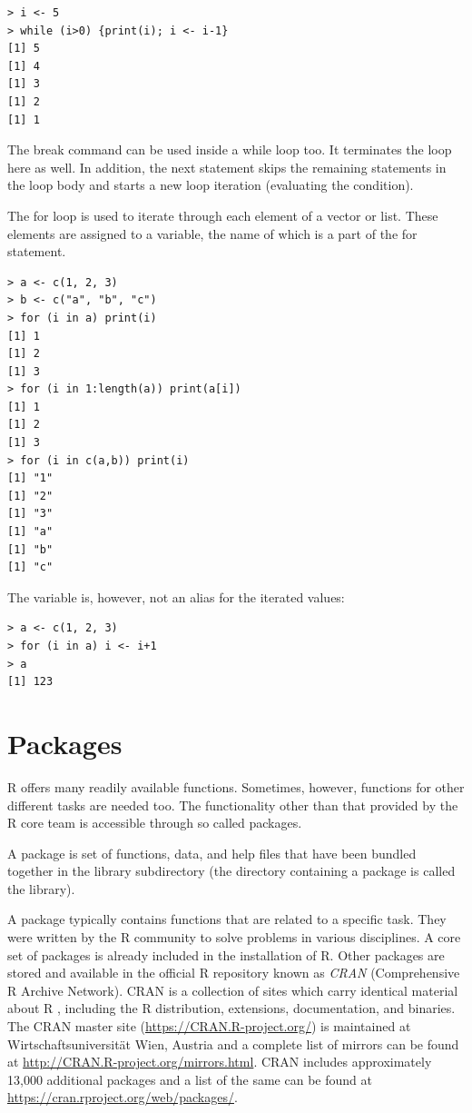 \documentclass[11pt,openany,executivepaper]{book}
\begin{document}
\begin{verbatim}
> i <- 5
> while (i>0) {print(i); i <- i-1}
[1] 5
[1] 4
[1] 3
[1] 2
[1] 1
\end{verbatim}

The break command can be used inside a while loop too. It terminates the loop here as well. In addition, the next statement skips the remaining statements in the loop body and starts a new loop iteration (evaluating the condition).

The for loop is used to iterate through each element of a vector or list. These elements are assigned to a variable, the name of which is a part of the for statement.

\begin{verbatim}
> a <- c(1, 2, 3)
> b <- c("a", "b", "c")
> for (i in a) print(i)
[1] 1
[1] 2
[1] 3
> for (i in 1:length(a)) print(a[i])
[1] 1
[1] 2
[1] 3
> for (i in c(a,b)) print(i)
[1] "1"
[1] "2"
[1] "3"
[1] "a"
[1] "b"
[1] "c"
\end{verbatim}

The variable is, however, not an alias for the iterated values:

\begin{verbatim}
> a <- c(1, 2, 3)
> for (i in a) i <- i+1
> a
[1] 123
\end{verbatim}

\section{Packages}
R offers many readily available functions. Sometimes, however, functions for other different tasks are needed too. The functionality other than that provided by the R core team is accessible through so called packages.

A package is set of functions, data, and help files that have been bundled together in the library subdirectory (the directory containing a package is called the library).
\begin{sloppypar}
A package typically contains functions that are related to a specific task. They were written by the R community to solve problems in various disciplines. A core set of packages is already included in the installation of R. Other packages are stored and available in the official R repository known as \textit{CRAN} (Comprehensive R Archive Network). CRAN is a collection of sites which carry identical material about R , including the R distribution, extensions, documentation, and binaries. The CRAN master site (\href{https://CRAN.R-project.org/}{https://CRAN.R-project.org/}) is maintained at Wirtschaftsuniversität Wien, Austria and a complete list of mirrors can be found at \url{http://CRAN.R-project.org/mirrors.html}. CRAN includes approximately 13,000 additional packages and a list of the same can be found at \href{https://cran.rproject.org/web/packages/}{https://cran.rproject.org/web/packages/}.
\end{sloppypar}
\end{document}
